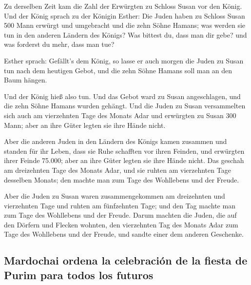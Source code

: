 Zu derselben Zeit kam die Zahl der Erwürgten zu Schloss
Susan vor den König.  Und der König sprach zu der Königin
Esther: Die Juden haben zu Schloss Susan 500 Mann erwürgt und umgebracht
und die zehn Söhne Hamans; was werden sie tun in den anderen Ländern des
Königs? Was bittest du, dass man dir gebe? und was forderst du mehr,
dass man tue?

 Esther sprach: Gefällt's dem König, so lasse er auch
morgen die Juden zu Susan tun nach dem heutigen Gebot, und die zehn
Söhne Hamans soll man an den Baum hängen.

 Und der König hieß also tun. Und das Gebot ward zu Susan
angeschlagen, und die zehn Söhne Hamans wurden gehängt. 
Und die Juden zu Susan versammelten sich auch am vierzehnten Tage des
Monats Adar und erwürgten zu Susan 300 Mann; aber an ihre Güter legten
sie ihre Hände nicht.

 Aber die anderen Juden in den Ländern des Königs kamen
zusammen und standen für ihr Leben, dass sie Ruhe schafften vor ihren
Feinden, und erwürgten ihrer Feinde 75.000; aber an ihre Güter legten
sie ihre Hände nicht.  Das geschah am dreizehnten Tage
des Monats Adar, und sie ruhten am vierzehnten Tage desselben Monats;
den machte man zum Tage des Wohllebens und der Freude.

 Aber die Juden zu Susan waren zusammengekommen am
dreizehnten und vierzehnten Tage und ruhten am fünfzehnten Tage; und den
Tag machte man zum Tage des Wohllebens und der Freude. 
Darum machten die Juden, die auf den Dörfern und Flecken wohnten, den
vierzehnten Tag des Monats Adar zum Tage des Wohllebens und der Freude,
und sandte einer dem anderen Geschenke.

\hypertarget{mardochai-ordena-la-celebraciuxf3n-de-la-fiesta-de-purim-para-todos-los-futuros}{%
\subsection{Mardochai ordena la celebración de la fiesta de Purim para
todos los
futuros}\label{mardochai-ordena-la-celebraciuxf3n-de-la-fiesta-de-purim-para-todos-los-futuros}}

